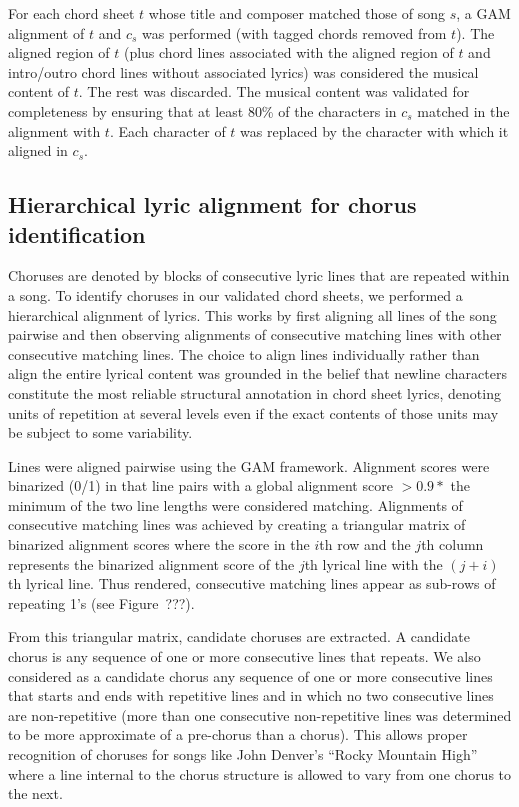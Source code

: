 \documentclass[letterpaper]{article}
\begin{document}
For each chord sheet $t$ whose title and composer matched those of song $s$, a GAM alignment of $t$ and $c_s$ was performed (with tagged chords removed from $t$). The aligned region of $t$ (plus chord lines associated with the aligned region of $t$ and intro/outro chord lines without associated lyrics) was considered the musical content of $t$. The rest was discarded. The musical content was validated for completeness by ensuring that at least 80\% of the characters in $c_s$ matched in the alignment with $t$. Each character of $t$ was replaced by the character with which it aligned in $c_s$.

\subsection{Hierarchical lyric alignment for chorus identification}

Choruses are denoted by blocks of consecutive lyric lines that are repeated within a song. To identify choruses in our validated chord sheets, we performed a hierarchical alignment of lyrics. This works by first aligning all lines of the song pairwise and then observing alignments of consecutive matching lines with other consecutive matching lines. The choice to align lines individually rather than align the entire lyrical content was grounded in the belief that newline characters constitute the most reliable structural annotation in chord sheet lyrics, denoting units of repetition at several levels even if the exact contents of those units may be subject to some variability. 

Lines were aligned pairwise using the GAM framework. Alignment scores were binarized (0/1) in that line pairs with a global alignment score $> 0.9*$ the minimum of the two line lengths were considered matching. Alignments of consecutive matching lines was achieved by creating a triangular matrix of binarized alignment scores where the score in the $i$th row and the $j$th column represents the binarized alignment score of the $j$th lyrical line with the $(j+i)$th lyrical line. Thus rendered, consecutive matching lines appear as sub-rows of repeating 1's (see Figure~???).

From this triangular matrix, candidate choruses are extracted. A candidate chorus is any sequence of one or more consecutive lines that repeats. We also considered as a candidate chorus any sequence of one or more consecutive lines that starts and ends with repetitive lines and in which no two consecutive lines are non-repetitive (more than one consecutive non-repetitive lines was determined to be more approximate of a pre-chorus than a chorus). This allows proper recognition of choruses for songs like John Denver's ``Rocky Mountain High'' where a line internal to the chorus structure is allowed to vary from one chorus to the next.
\end{document}
